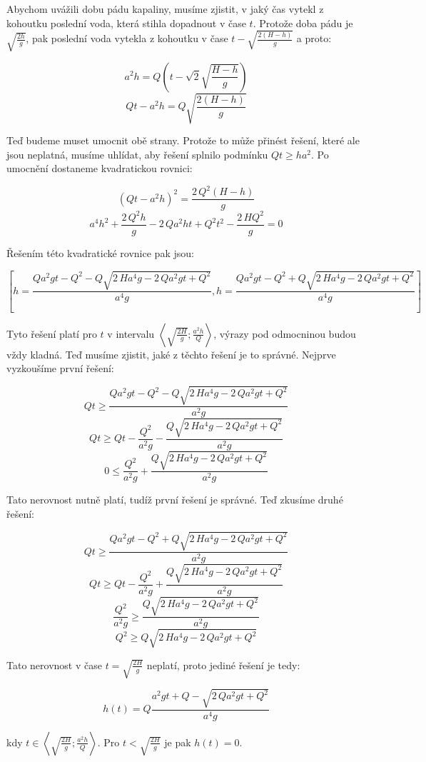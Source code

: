 \documentclass{fkssolpub}
\author{Ondřej Sedláček}
\begin{document}
Abychom uvážili dobu pádu kapaliny, musíme zjistit, v jaký čas vytekl z kohoutku poslední voda, která stihla dopadnout v čase $t$. Protože doba pádu je $\sqrt{\frac{2h}{g}}$, pak poslední voda vytekla z kohoutku v čase $t - \sqrt{\frac{2 (H - h)}{g}}$ a proto:

\[
	a^{2} h = Q {\left(t - \sqrt{2} \sqrt{\frac{H - h}{g}}\right)}
\]
\[
	Q t - a^{2} h = Q \sqrt{\frac{2(H - h)}{g}}
\]

Teď budeme muset umocnit obě strany. Protože to může přinést řešení, které ale jsou neplatná, musíme uhlídat, aby řešení splnilo podmínku $Qt \geq h a^2$. Po umocnění dostaneme kvadratickou rovnici:

\[
	{\left(Q t - a^{2} h\right)}^{2} = \frac{2 \, Q^{2} (H - h)}{g}
\]
\[
	a^{4} h^{2} + \frac{2 \, Q^{2} h}{g} - 2 \, Q a^{2} h t + Q^{2} t^{2} - \frac{2 \, H Q^{2}}{g} = 0
\]

Řešením této kvadratické rovnice pak jsou:

\[
	\left[h = \frac{Q a^{2} g t - Q^{2} - Q \sqrt{2 \, H a^{4} g - 2 \, Q a^{2} g t + Q^{2}} }{a^{4} g}, h = \frac{Q a^{2} g t - Q^{2} + Q \sqrt{2 \, H a^{4} g - 2 \, Q a^{2} g t + Q^{2}} }{a^{4} g}\right]
\]

Tyto řešení platí pro $t$ v intervalu $\left\langle\sqrt{\frac{2 H}{g}}; \frac{a^2 h}{Q}\right\rangle$, výrazy pod odmocninou budou vždy kladná. Teď musíme zjistit, jaké z těchto řešení je to správné. Nejprve vyzkoušíme první řešení:

\[
	Q t \geq \frac{Q a^{2} g t - Q^{2} - Q \sqrt{2 \, H a^{4} g - 2 \, Q a^{2} g t + Q^{2}} }{a^{2} g}
\]
\[
	Q t \geq Q t - \frac{Q^{2}}{a^{2} g} - \frac{Q \sqrt{2 \, H a^{4} g - 2 \, Q a^{2} g t + Q^{2}} }{a^{2} g}
\]
\[
	0 \leq \frac{Q^{2}}{a^{2} g} + \frac{Q \sqrt{2 \, H a^{4} g - 2 \, Q a^{2} g t + Q^{2}} }{a^{2} g}
\]

Tato nerovnost nutně platí, tudíž první řešení je správné. Teď zkusíme druhé řešení:

\[
	Q t \geq \frac{Q a^{2} g t - Q^{2} + Q \sqrt{2 \, H a^{4} g - 2 \, Q a^{2} g t + Q^{2}} }{a^{2} g}
\]
\[
	Q t \geq Q t - \frac{Q^{2}}{a^{2} g} + \frac{Q \sqrt{2 \, H a^{4} g - 2 \, Q a^{2} g t + Q^{2}} }{a^{2} g}
\]
\[
	\frac{Q^{2}}{a^{2} g} \geq \frac{Q \sqrt{2 \, H a^{4} g - 2 \, Q a^{2} g t + Q^{2}} }{a^{2} g}
\]
\[
	Q^{2} \geq Q \sqrt{2 \, H a^{4} g - 2 \, Q a^{2} g t + Q^{2}}
\]

Tato nerovnost v čase $t = \sqrt{\frac{2H}{g}}$ neplatí, proto jediné řešení je tedy:

\[
	h(t) = Q \frac{a^{2} g t + Q - \sqrt{2 \, Q a^{2} g t + Q^{2}} }{a^{4} g}
\]

kdy $t \in \left\langle\sqrt{\frac{2 H}{g}}; \frac{a^2 h}{Q}\right\rangle$. Pro $t < \sqrt{\frac{2 H}{g}}$ je pak $h(t) = 0$.
\end{document}
